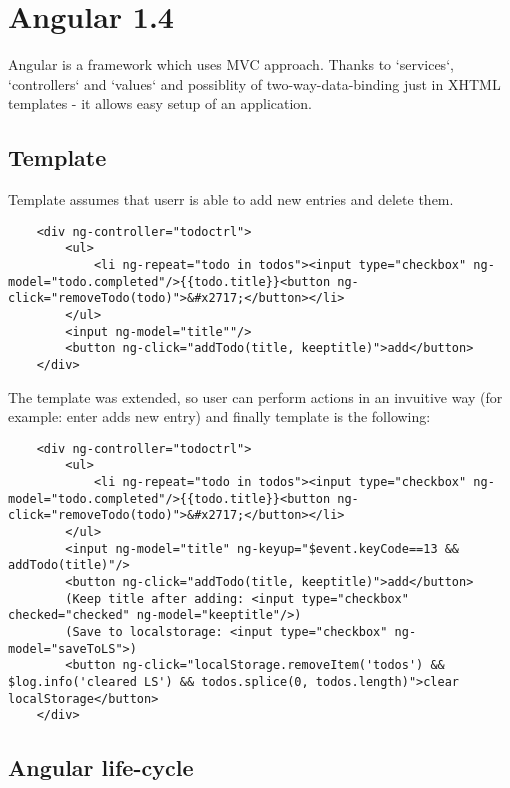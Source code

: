 \documentclass[inzynier,druk,ramka]{build/dyplom}
\begin{document}
\chapter{Angular 1.4}

Angular is a framework which uses MVC approach. Thanks to `services`, `controllers` and `values` and possiblity of two-way-data-binding just in XHTML templates - it allows easy setup of an application.

\section{Template}

Template assumes that userr is able to add new entries and delete them.

\begin{lstlisting}
    <div ng-controller="todoctrl">
        <ul>
            <li ng-repeat="todo in todos"><input type="checkbox" ng-model="todo.completed"/>{{todo.title}}<button ng-click="removeTodo(todo)">&#x2717;</button></li>
        </ul>
        <input ng-model="title""/>
        <button ng-click="addTodo(title, keeptitle)">add</button>
    </div>
\end{lstlisting}

The template was extended, so user can perform actions in an invuitive way (for example: enter adds new entry) and finally template is the following:

\begin{lstlisting}
    <div ng-controller="todoctrl">
        <ul>
            <li ng-repeat="todo in todos"><input type="checkbox" ng-model="todo.completed"/>{{todo.title}}<button ng-click="removeTodo(todo)">&#x2717;</button></li>
        </ul>
        <input ng-model="title" ng-keyup="$event.keyCode==13 && addTodo(title)"/>
        <button ng-click="addTodo(title, keeptitle)">add</button>
        (Keep title after adding: <input type="checkbox" checked="checked" ng-model="keeptitle"/>)
        (Save to localstorage: <input type="checkbox" ng-model="saveToLS">)
        <button ng-click="localStorage.removeItem('todos') && $log.info('cleared LS') && todos.splice(0, todos.length)">clear localStorage</button>
    </div>
\end{lstlisting}

\section{Angular life-cycle}

%
\end{document}
